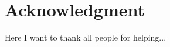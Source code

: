 \newpage
\thispagestyle{empty}
\section*{Acknowledgment}
Here I want to thank all people for helping...
